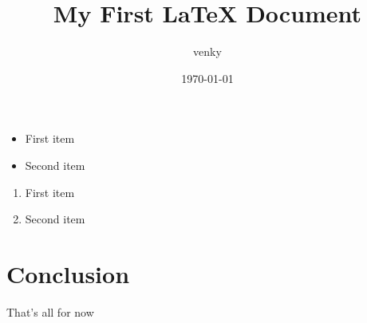 \documentclass{article}
\title{My First LaTeX Document}
\author{venky}
\date{\today}
\begin{document}
 
 	\maketitle
 
  
 
 	\begin{itemize}
 		\item First item
 		\item Second item
 	\end{itemize}
 \begin{enumerate}
 	\item First item
 	\item Second item
 \end{enumerate}
 	\section{Conclusion}
 	That’s all for now
 
\end{document}
